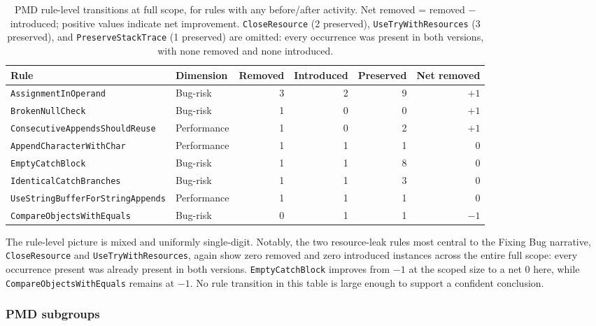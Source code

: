 \begin{table}[htbp]
\centering
\caption{PMD rule-level transitions at full scope, for rules with any before/after activity.
Net removed = removed $-$ introduced; positive values indicate net improvement.
\texttt{CloseResource} (2 preserved), \texttt{UseTryWithResources} (3 preserved), and \texttt{PreserveStackTrace} (1 preserved) are omitted: every occurrence was present in both versions, with none removed and none introduced.}
\label{tab:ba-full-pmd-rules}
\small
\begin{tabular}{llrrrr}
\toprule
Rule & Dimension & Removed & Introduced & Preserved & Net removed \\
\midrule
\texttt{AssignmentInOperand}             & Bug-risk    & 3 & 2 & 9 & $+1$ \\
\texttt{BrokenNullCheck}                 & Bug-risk    & 1 & 0 & 0 & $+1$ \\
\texttt{ConsecutiveAppendsShouldReuse}   & Performance & 1 & 0 & 2 & $+1$ \\
\texttt{AppendCharacterWithChar}         & Performance & 1 & 1 & 1 & $0$ \\
\texttt{EmptyCatchBlock}                 & Bug-risk    & 1 & 1 & 8 & $0$ \\
\texttt{IdenticalCatchBranches}          & Bug-risk    & 1 & 1 & 3 & $0$ \\
\texttt{UseStringBufferForStringAppends} & Performance & 1 & 1 & 1 & $0$ \\
\texttt{CompareObjectsWithEquals}        & Bug-risk    & 0 & 1 & 1 & $-1$ \\
\bottomrule
\end{tabular}
\end{table}

The rule-level picture is mixed and uniformly single-digit.
Notably, the two resource-leak rules most central to the Fixing Bug narrative, \texttt{CloseResource} and \texttt{UseTryWithResources}, again show zero removed and zero introduced instances across the entire full scope: every occurrence present was already present in both versions.
\texttt{EmptyCatchBlock} improves from $-1$ at the scoped size to a net $0$ here, while \texttt{CompareObjectsWithEquals} remains at $-1$.
No rule transition in this table is large enough to support a confident conclusion.

\subsubsection*{PMD subgroups}

